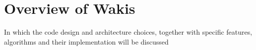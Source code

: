 %
\chapter{Overview of Wakis}
\label{ch::chapter4}

\begin{center}
  \begin{minipage}{0.5\textwidth}
    \begin{small}
      In which the code design and architecture choices, together with specific features, algorithms and their implementation will be discussed
    \end{small}
  \end{minipage}
  \vspace{0.5cm}
\end{center}



